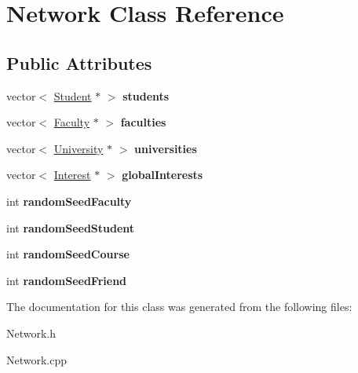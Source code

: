 \hypertarget{classNetwork}{\section{\-Network \-Class \-Reference}
\label{classNetwork}
}
\subsection*{\-Public \-Attributes}
\begin{DoxyCompactItemize}
\item 
\hypertarget{classNetwork_a802a2cb8ba24b576d11ec16d0c5a493a}{vector$<$ \hyperlink{classStudent}{\-Student} $\ast$ $>$ {\bfseries students}}\label{classNetwork_a802a2cb8ba24b576d11ec16d0c5a493a}

\item 
\hypertarget{classNetwork_ae1e8085157424b173863db7aa84b6371}{vector$<$ \hyperlink{classFaculty}{\-Faculty} $\ast$ $>$ {\bfseries faculties}}\label{classNetwork_ae1e8085157424b173863db7aa84b6371}

\item 
\hypertarget{classNetwork_a421a4db7f2b02fbb199aaf6ff2a260ff}{vector$<$ \hyperlink{classUniversity}{\-University} $\ast$ $>$ {\bfseries universities}}\label{classNetwork_a421a4db7f2b02fbb199aaf6ff2a260ff}

\item 
\hypertarget{classNetwork_ac4eab03bd056f316fd90a4db4375292d}{vector$<$ \hyperlink{classInterest}{\-Interest} $\ast$ $>$ {\bfseries global\-Interests}}\label{classNetwork_ac4eab03bd056f316fd90a4db4375292d}

\item 
\hypertarget{classNetwork_a74f31cac6951806d60f1571e48fba344}{int {\bfseries random\-Seed\-Faculty}}\label{classNetwork_a74f31cac6951806d60f1571e48fba344}

\item 
\hypertarget{classNetwork_a55b06846b388b9f831e53a82782060fb}{int {\bfseries random\-Seed\-Student}}\label{classNetwork_a55b06846b388b9f831e53a82782060fb}

\item 
\hypertarget{classNetwork_a5a9976ad581749f111d4a99566715a35}{int {\bfseries random\-Seed\-Course}}\label{classNetwork_a5a9976ad581749f111d4a99566715a35}

\item 
\hypertarget{classNetwork_ae738cab1dd360159176ba024d72ebc6d}{int {\bfseries random\-Seed\-Friend}}\label{classNetwork_ae738cab1dd360159176ba024d72ebc6d}

\end{DoxyCompactItemize}


\-The documentation for this class was generated from the following files\-:\begin{DoxyCompactItemize}
\item 
\-Network.\-h\item 
\-Network.\-cpp\end{DoxyCompactItemize}
